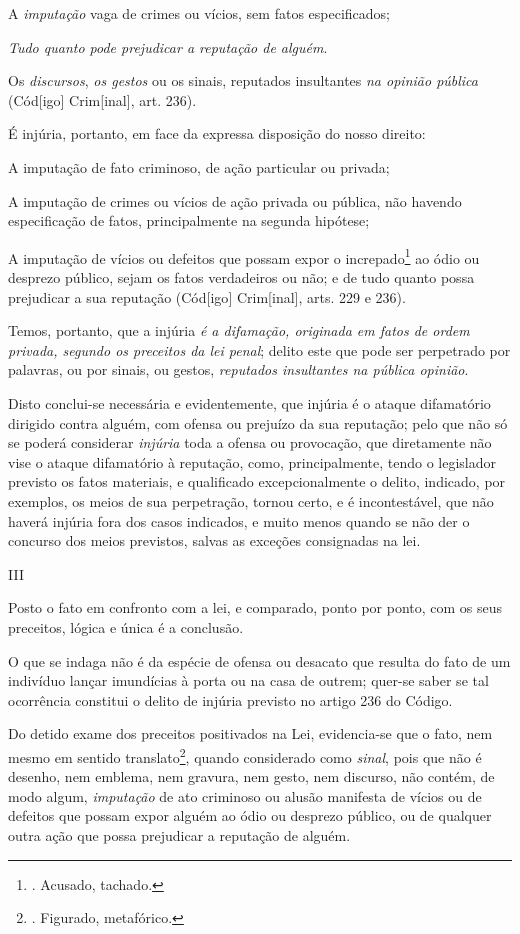 A \emph{imputação} vaga de crimes ou vícios, sem fatos especificados;

\emph{Tudo quanto pode prejudicar a reputação de alguém}.

Os \emph{discursos}, \emph{os gestos} ou os sinais, reputados
insultantes \emph{na opinião pública} (Cód{[}igo{]} Crim{[}inal{]}, art.
236).

É injúria, portanto, em face da expressa disposição do nosso direito:

A imputação de fato criminoso, de ação particular ou privada;

A imputação de crimes ou vícios de ação privada ou pública, não havendo
especificação de fatos, principalmente na segunda hipótese;

A imputação de vícios ou defeitos que possam expor o increpado\footnote{.
  Acusado, tachado.} ao ódio ou desprezo público, sejam os fatos
verdadeiros ou não; e de tudo quanto possa prejudicar a sua reputação
(Cód{[}igo{]} Crim{[}inal{]}, arts. 229 e 236).

Temos, portanto, que a injúria \emph{é a difamação, originada em fatos
de ordem privada, segundo os preceitos da lei penal}; delito este que
pode ser perpetrado por palavras, ou por sinais, ou gestos,
\emph{reputados insultantes na pública opinião}.

Disto conclui-se necessária e evidentemente, que injúria é o ataque
difamatório dirigido contra alguém, com ofensa ou prejuízo da sua
reputação; pelo que não só se poderá considerar \emph{injúria} toda a
ofensa ou provocação, que diretamente não vise o ataque difamatório à
reputação, como, principalmente, tendo o legislador previsto os fatos
materiais, e qualificado excepcionalmente o delito, indicado, por
exemplos, os meios de sua perpetração, tornou certo, e é incontestável,
que não haverá injúria fora dos casos indicados, e muito menos quando se
não der o concurso dos meios previstos, salvas as exceções consignadas
na lei.

III

Posto o fato em confronto com a lei, e comparado, ponto por ponto, com
os seus preceitos, lógica e única é a conclusão.

O que se indaga não é da espécie de ofensa ou desacato que resulta do
fato de um indivíduo lançar imundícias à porta ou na casa de outrem;
quer-se saber se tal ocorrência constitui o delito de injúria previsto
no artigo 236 do Código.

Do detido exame dos preceitos positivados na Lei, evidencia-se que o
fato, nem mesmo em sentido translato\footnote{. Figurado, metafórico.},
quando considerado como \emph{sinal}, pois que não é desenho, nem
emblema, nem gravura, nem gesto, nem discurso, não contém, de modo
algum, \emph{imputação} de ato criminoso ou alusão manifesta de vícios
ou de defeitos que possam expor alguém ao ódio ou desprezo público, ou
de qualquer outra ação que possa prejudicar a reputação de alguém.

